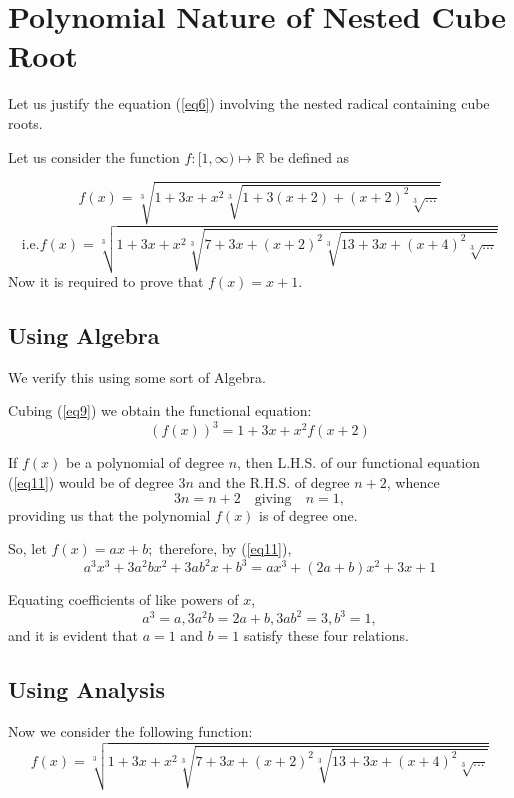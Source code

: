 \documentclass[runningheads]{llncs}
\begin{document}
\section{Polynomial Nature of Nested Cube Root}

Let us justify the equation (\ref{eq6}) involving the nested radical containing cube roots.

Let us consider the function $ f: {[1,\infty)} \mapsto \mathbb{R} $ be defined as

\begin{equation} \label{eq9}
f(x) = \sqrt[3]{1+3x+x^2\sqrt[3]{1+3(x+2)+(x+2)^2\sqrt[3]{...}}}
\end{equation}
\begin{equation} \label{eq10}
\text{i.e.}
f(x)= \sqrt[3]{1+3x+x^2\sqrt[3]{7+3x+(x+2)^2\sqrt[3]{13+3x+(x+4)^2\sqrt[3]{...}}}} 
\end{equation}
Now it is required to prove that $ f(x)=x+1 $.

\subsection{Using Algebra}
We verify this using some sort of Algebra.

Cubing (\ref{eq9}) we obtain the functional equation:
\begin{equation} \label{eq11}
(f(x))^3 = 1+3x+x^2f(x+2) 
\end{equation}

If $ f(x) $ be a polynomial of degree $ n $, then L.H.S. of our functional equation (\ref{eq11}) would be of degree $ 3n $ and the R.H.S. of degree $ n+2 $, whence
\[ 3n = n+2  \quad \textrm{giving} \quad n = 1 , \]
providing us that the polynomial $ f(x ) $ is of degree one.

So, let $ f(x) = ax+b ; $ therefore, by (\ref{eq11}),
\[ a^3x^3 + 3a^2bx^2 + 3ab^2x + b^3 = ax^3 + (2a+b)x^2 + 3x +1 \]

Equating coefficients of like powers of $ x $,
\[ a^3=a, 3a^2b = 2a+b, 3ab^2 = 3, b^3 = 1 , \]
and it is evident that $ a = 1 $ and $ b = 1 $ satisfy these four relations.

\subsection{Using Analysis}

Now we consider the following function:
\[ f(x)= \sqrt[3]{1+3x+x^2\sqrt[3]{7+3x+(x+2)^2\sqrt[3]{13+3x+(x+4)^2\sqrt[3]{...}}}} \tag{9} \] 
\end{document}
